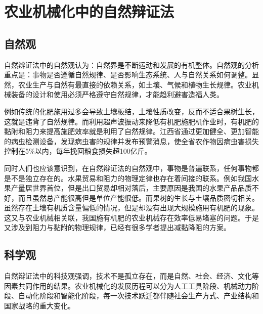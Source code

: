 \documentclass[12pt,fontset=windows,titlepage]{ctexart}
\begin{document}
	\section{农业机械化中的自然辩证法}

	\subsection{自然观}

	自然辨证法中的自然观认为：自然界是不断运动和发展的有机整体\autocite{ZiRanBianZhengFaGaiLun2025NianBanChuBan2025}。自然观的分析重点是：事物是否遵循自然规律、是否影响生态系统、人与自然关系如何调整。显然，农业生产与自然有最直接的依赖关系，如土壤、气候和植物生长规律。农业机械装备的设计和使用必须严格遵守自然规律，才能趋利避害造福人类。

	例如传统的化肥施用过多会导致土壤板结，土壤性质改变，反而不适合果树生长\autocite{FuShengKangMiHouTaoYuanYouJiFeiLiaoShiFeiJiSheJiYuShiYan2024}，这就是违背了自然规律。而利用超声波振动来降低有机肥施肥机作业时，有机肥的黏附和阻力来提高施肥效率就是利用了自然规律\autocite{CaoHuanJiYuChaoShengBoZhenDongDeFeiXiangKangNianJianZuTeXingFenXiYuZhuangZhiSheJi}。江西省通过更加健全、更加智能的病虫检测设备，发现病虫害的规律并发布预警消息，使全省农作物因病虫害损失控制在5\%以内，每年挽回粮食损失超100亿斤\autocite{LiYaoWenKeJiZhiBaoMeiNianWanHuiLiangShiSunShiChao100YiJin2025}。

	同时人们也应该意识到，在自然辩证法的自然观中，事物是普遍联系，任何事物都是不是独立存在的。水果贸易和阻力的物理定律也存在着间接的联系。例如我国水果产量居世界首位，但是出口贸易却相对落后，主要原因是我国的水果产品品质不好，而且虽然总产能很高但是单位产能很低\autocite{WangHaiBoWoGuoGuoYeChongDaShiMingHeShiSiWuChongDianRenWu2022}。而果树的生长与土壤品质密切相关。虽然存在土壤有机质含量偏低的情况，但是却没有出现大规模施用有机肥的现象。这又与农业机械相关联，我国施有机肥的农业机械存在效率低易堵塞的问题。于是又涉及到阻力与黏附的物理规律，已经有很多学者提出减黏降阻的方案\autocite{CaoHuanJiYuChaoShengBoZhenDongDeFeiXiangKangNianJianZuTeXingFenXiYuZhuangZhiSheJi}。

	\subsection{科学观}

	自然辩证法中的科技观强调，技术不是孤立存在，而是自然、社会、经济、文化等因素共同作用的结果\autocite{ZiRanBianZhengFaGaiLun2025NianBanChuBan2025}。农业机械化的发展历程可以分为人工工具阶段、机械动力阶段、自动化阶段和智能化阶段，每一次技术跃迁都伴随社会生产方式、产业结构和国家战略的重大变化。
\end{document}
